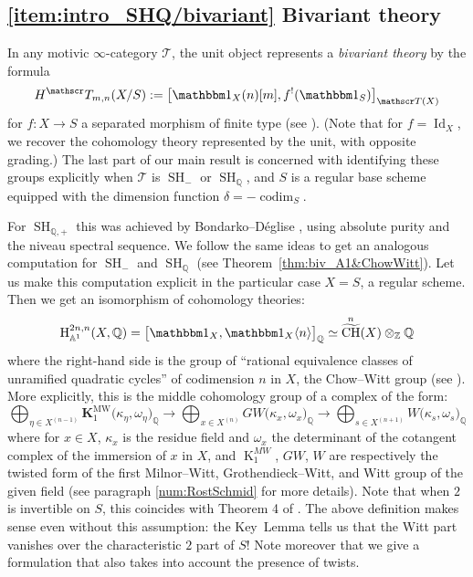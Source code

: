 \documentclass[JEP,XML,SOM,Unicode]{cedram}
\newcommand{\T}{\mathscr T}
\renewcommand{\AA}{\mathbb A}
\newcommand{\un}{\mathbbm 1}
\newcommand{\KMW}{\mathbf K^\mathrm{MW}}
\newcommand{\HA}{\mathrm H_{\AA^1}}
\DeclareMathOperator{\codim}{codim}
\DeclareMathOperator{\SH}{SH}
\DeclareMathOperator{\Id}{Id}
\DeclareMathOperator{\wCH}{\widetilde{CH}}
\newcommand{\twist}[1]{\langle #1 \rangle}
\DeclareMathOperator{\K}{K}
\newcommand{\ZZ} {\mathbb Z}
\newcommand{\QQ} {\mathbb Q}
\theoremstyle{remark}
\theoremstyle{definition}
\numberwithin{equation}{thm}
\begin{document}
\subsection*{\eqref{item:intro_SHQ/bivariant} Bivariant theory}

In any motivic $\infty$-category $\T$, the unit object represents a \emph{bivariant theory} by the formula
\[
H^\T_{m,n}(X/S) := \big[ \un_X(n)[m], f^!(\un_S) \big]_{\T(X)}
\]
for $f : X \to S$ a separated morphism of finite type (see \cite[Def.\,1.2.2]{DegliseBivariant}).
(Note that for $f=\Id_X$, we recover the cohomology theory represented by the unit, with opposite grading.)
The last part of our main result is concerned with identifying these groups explicitly when $\T$ is $\SH_{-}$ or $\SH_\QQ$, and $S$ is a regular base scheme equipped with the dimension function $\delta = -\codim_S$.

For $\SH_{\QQ,+}$ this was achieved by Bondarko--Déglise \cite[Th.\,2]{BD1}, using absolute purity and the niveau spectral sequence.
We follow the same ideas to get an analogous computation for $\SH_{-}$ and $\SH_\QQ$ (see Theorem~\ref{thm:biv_A1&ChowWitt}).
Let us make this computation explicit in the particular case $X=S$, a regular scheme.
Then we get an isomorphism of cohomology theories:
\[
\HA^{2n,n}(X,\QQ)=\big[\un_X,\un_X\twist n\big]_\QQ \simeq \wCH^n(X) \otimes_\ZZ \QQ
\]
where the right-hand side is the group of ``rational equivalence classes of unramified quadratic cycles'' of codimension $n$ in $X$, \ie the Chow--Witt group (see \cite{Fasel_wCH, FaselSrinivas}).
More explicitly, this is the middle cohomology group of a complex of the form:
\[
\bigoplus_{\eta \in X^{(n-1)}} \KMW_1\big(\kappa_\eta,\omega_\eta\big)_\QQ
\to \bigoplus_{x \in X^{(n)}} GW\big(\kappa_x,\omega_x\big)_\QQ
\to \bigoplus_{s \in X^{(n+1)}} W\big(\kappa_s,\omega_s\big)_\QQ
\]
where for $x \in X$, $\kappa_x$ is the residue field
and $\omega_x$ the determinant of the cotangent complex of the immersion of $x$ in $X$,
and $\K_1^{MW}$, $GW$, $W$ are respectively the twisted form of the
first Milnor--Witt, Grothendieck--Witt, and Witt group of the given field
(see paragraph \ref{num:RostSchmid} for more details).
Note that when $2$ is invertible on $S$, this coincides with Theorem 4 of \cite{FaselSrinivas}.
The above definition makes sense even without this assumption: the Key~Lemma tells us that the Witt part vanishes over the characteristic $2$ part of $S$!
Note moreover that we give a formulation that also takes into account the presence of twists.
\end{document}
